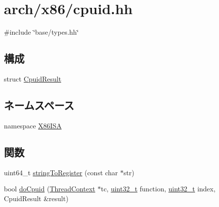 \hypertarget{cpuid_8hh}{
\section{arch/x86/cpuid.hh}
\label{cpuid_8hh}
}
{\ttfamily \#include \char`\"{}base/types.hh\char`\"{}}\par
\subsection*{構成}
\begin{DoxyCompactItemize}
\item 
struct \hyperlink{structX86ISA_1_1CpuidResult}{CpuidResult}
\end{DoxyCompactItemize}
\subsection*{ネームスペース}
\begin{DoxyCompactItemize}
\item 
namespace \hyperlink{namespaceX86ISA}{X86ISA}
\end{DoxyCompactItemize}
\subsection*{関数}
\begin{DoxyCompactItemize}
\item 
uint64\_\-t \hyperlink{namespaceX86ISA_a50d9573eb56ab6412eb6b6bbba31f440}{stringToRegister} (const char $\ast$str)
\item 
bool \hyperlink{namespaceX86ISA_a1cf7354b42b56aa483040caaa06d7be4}{doCpuid} (\hyperlink{classThreadContext}{ThreadContext} $\ast$tc, \hyperlink{Type_8hh_a435d1572bf3f880d55459d9805097f62}{uint32\_\-t} function, \hyperlink{Type_8hh_a435d1572bf3f880d55459d9805097f62}{uint32\_\-t} index, CpuidResult \&result)
\end{DoxyCompactItemize}
